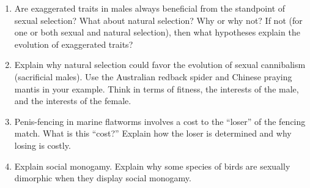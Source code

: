 \documentclass[letterpaper]{tufte-handout}
\begin{document}
\begin{enumerate}
	\item Are exaggerated traits in males always beneficial from the standpoint of sexual selection?  What about natural selection?  Why or why not?  If not (for one or both sexual and natural selection), then what hypotheses explain the evolution of exaggerated traits?

	\item Explain why natural selection could favor the evolution of sexual cannibalism (sacrificial males).  Use the Australian redback spider and Chinese praying mantis in your example.  Think in terms of fitness, the interests of the male, and the interests of the female.

	\item Penis-fencing in marine flatworms involves a cost to the ``loser'' of the fencing match. What is this ``cost?''  Explain how the loser is determined and why losing is costly.  

	\item Explain social monogamy. Explain why some species of birds are sexually dimorphic when they display social monogamy.

\end{enumerate}
\end{document}
